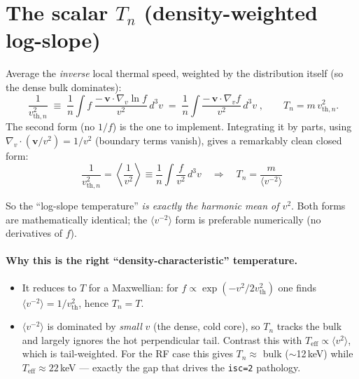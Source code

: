 \documentclass[11pt,a4paper]{article}
\begin{document}
\section{The scalar $T_n$ (density-weighted log-slope)}

Average the \emph{inverse} local thermal speed, weighted by the distribution
itself (so the dense bulk dominates):
\begin{equation}
  \boxed{\;
  \frac{1}{v_{\mathrm{th},n}^2}
  \;\equiv\;
  \frac{1}{n}\int f\;\frac{-\,\mathbf v\cdot\nabla_v \ln f}{v^2}\,d^3v
  \;=\;
  \frac{1}{n}\int \frac{-\,\mathbf v\cdot\nabla_v f}{v^2}\,d^3v
  \;}, \qquad T_n = m\,v_{\mathrm{th},n}^2 .
\end{equation}
The second form (no $1/f$) is the one to implement. Integrating it by parts,
using $\nabla_v\!\cdot(\mathbf v/v^2) = 1/v^2$ (boundary terms vanish), gives a
remarkably clean closed form:
\begin{equation}
  \boxed{\;
  \frac{1}{v_{\mathrm{th},n}^2}
  = \left\langle \frac{1}{v^2}\right\rangle
  \equiv \frac{1}{n}\int \frac{f}{v^2}\,d^3v
  \quad\Longrightarrow\quad
  T_n = \frac{m}{\langle v^{-2}\rangle}
  \;}
\end{equation}

So the ``log-slope temperature'' \emph{is exactly the harmonic mean of
$v^2$}. Both forms are mathematically identical; the $\langle v^{-2}\rangle$
form is preferable numerically (no derivatives of $f$).

\paragraph{Why this is the right ``density-characteristic'' temperature.}
\begin{itemize}
  \item It reduces to $T$ for a Maxwellian: for
        $f\propto\exp(-v^2/2v_\mathrm{th}^2)$ one finds
        $\langle v^{-2}\rangle = 1/v_\mathrm{th}^2$, hence $T_n = T$.
  \item $\langle v^{-2}\rangle$ is dominated by \emph{small} $v$ (the dense,
        cold core), so $T_n$ tracks the bulk and largely ignores the hot
        perpendicular tail. Contrast this with
        $T_\mathrm{eff}\propto\langle v^2\rangle$, which is tail-weighted. For
        the RF case this gives $T_n\approx$ bulk ($\sim$12\,keV) while
        $T_\mathrm{eff}\approx22$\,keV --- exactly the gap that drives the
        \texttt{isc=2} pathology.
\end{itemize}
\end{document}
